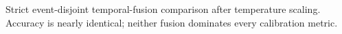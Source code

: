 \begin{table}[t]
\centering
\caption{Strict event-disjoint temporal-fusion comparison after temperature
scaling. Accuracy is nearly identical; neither fusion dominates every
calibration metric.}
\label{tab:difference_attention}
\resizebox{\columnwidth}{!}{
}
\end{table}
